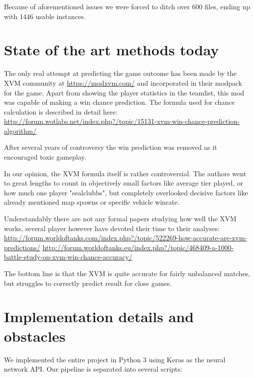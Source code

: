\documentclass{report}
\begin{document}
Because of aforementioned issues we were forced to ditch over 600 files, ending up with 1446 usable instances.

\section{State of the art methods today}

The only real attempt at predicting the game outcome has been made by the XVM community at
 \url{https://modxvm.com/} and incorporated in their modpack for the game. Apart from showing the 
player statistics in the teamlist, this mod was capable of making a win chance prediction.
The formula used for chance calculation is described in detail here:
\url{http://forum.wotlabs.net/index.php?/topic/15131-xvm-win-chance-prediction-algorithm/}

After several years of controversy the win prediction was removed as it encouraged toxic gameplay.

In our opinion, the XVM formula itself is rather controversial. The authors went to great lengths to count in 
objectively small factors like average tier played, or how much one player "sealclubbs", but completely 
overlooked decisive factors like already mentioned map spawns or specific vehicle winrate. 

Understandably there are not any formal papers studying how well the XVM works, several player however have devoted their time to their analyses:
\url{http://forum.worldoftanks.com/index.php?/topic/522269-how-accurate-are-xvm-predictions/}
\url{http://forum.worldoftanks.eu/index.php?/topic/468409-a-1000-battle-study-on-xvm-win-chance-accuracy/}

The bottom line is that the XVM is quite accurate for fairly unbalanced matches, but struggles to correctly predict 
result for close games. 

\section{Implementation details and obstacles}

We implemented the entire project in Python 3 using Keras as the neural network API.
Our pipeline is separated into several scripts:
\end{document}
